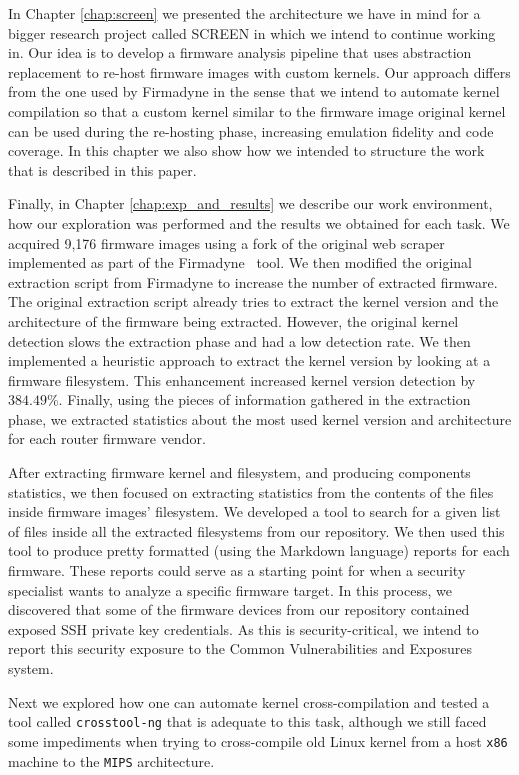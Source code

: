In Chapter \ref{chap:screen} we presented the architecture we have in mind for a bigger research project called SCREEN in which we intend to continue working in. Our idea is to develop a firmware analysis pipeline that uses abstraction replacement to re-host firmware images with custom kernels. Our approach differs from the one used by Firmadyne in the sense that we intend to automate kernel compilation so that a custom kernel similar to the firmware image original kernel can be used during the re-hosting phase, increasing emulation fidelity and code coverage. In this chapter we also show how we intended to structure the work that is described in this paper.

Finally, in Chapter \ref{chap:exp_and_results} we describe our work environment, how our exploration was performed and the results we obtained for each task. We acquired 9,176 firmware images using a fork of the original web scraper implemented as part of the Firmadyne~\cite{firmadyne} tool. We then modified the original extraction script from Firmadyne to increase the number of extracted firmware. The original extraction script already tries to extract the kernel version and the architecture of the firmware being extracted. However, the original kernel detection slows the extraction phase and had a low detection rate. We then implemented a heuristic approach to extract the kernel version by looking at a firmware filesystem. This enhancement increased kernel version detection by $384.49\%$. Finally, using the pieces of information gathered in the extraction phase, we extracted statistics about the most used kernel version and architecture for each router firmware vendor.

After extracting firmware kernel and filesystem, and producing components statistics, we then focused on extracting statistics from the contents of the files inside firmware images' filesystem. We developed a tool to search for a given list of files inside all the extracted filesystems from our repository. We then used this tool to produce pretty formatted (using the Markdown language) reports for each firmware. These reports could serve as a starting point for when a security specialist wants to analyze a specific firmware target. In this process, we discovered that some of the firmware devices from our repository contained exposed SSH private key credentials. As this is security-critical, we intend to report this security exposure to the Common Vulnerabilities and Exposures system.

Next we explored how one can automate kernel cross-compilation and tested a tool called {\tt crosstool-ng} that is adequate to this task, although we still faced some impediments when trying to cross-compile old Linux kernel from a host {\tt x86} machine to the {\tt MIPS} architecture.

